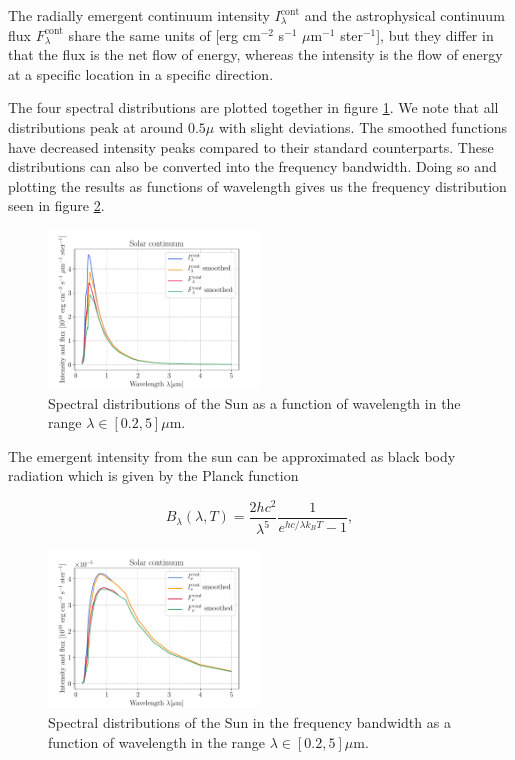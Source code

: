 \documentclass[a4paper,11.5pt,]{article}
\begin{document}
\begin{multicols}{2}
The radially emergent continuum intensity $I_\lambda^\mathrm{cont}$ and the astrophysical continuum flux $F_\lambda^\mathrm{cont}$ share the same units of [erg cm$^{-2}$ s$^{-1}$ $\mu$m$^{-1}$ ster$^{-1}$], but they differ in that the flux is the net flow of energy, whereas the intensity is the flow of energy at a specific location in a specific direction. 

The four spectral distributions are plotted together in figure \ref{fig: Solar Cont}. We note that all distributions peak at around $0.5 \mu$ with slight deviations. The smoothed functions have decreased intensity peaks compared to their standard counterparts. These distributions can also be converted into the frequency bandwidth. Doing so and plotting the results as functions of wavelength gives us the frequency distribution seen in figure \ref{fig: Solar freq}.


\begin{figure}[H]
    \centering
    \includegraphics[width = 0.5\textwidth]{figures/2.1/solarcontinuum.pdf}
    \caption{Spectral distributions of the Sun as a function of wavelength in the range $\lambda \in [0.2,5]\mu$m.}
    \label{fig: Solar Cont}
\end{figure}

The emergent intensity from the sun can be approximated as black body radiation which is given by the Planck function

\begin{equation}\label{eq: Planck}
    B _ { \lambda } ( \lambda , T ) = \frac { 2 h c ^ { 2 } } { \lambda ^ { 5 } } \frac { 1 } { e ^{  h c / \lambda k _ {  B  } T } - 1},
\end{equation}

\begin{figure}[H]
    \centering
    \includegraphics[width = 0.5\textwidth]{figures/2.1/solarcontinuum_freq.pdf}
    \caption{Spectral distributions of the Sun in the frequency bandwidth as a function of wavelength in the range $\lambda \in [0.2,5]\mu$m.}
    \label{fig: Solar freq}
\end{figure}


\end{multicols}
\end{document}

